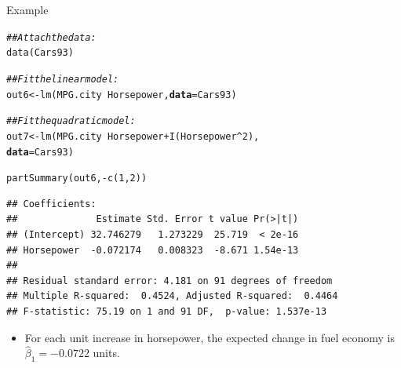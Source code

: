 \documentclass{beamer}\usepackage[]{graphicx}\usepackage[]{color}
\makeatletter
\newcommand{\hlnum}[1]{\textcolor[rgb]{0.69,0.494,0}{#1}}%
\newcommand{\hlcom}[1]{\textcolor[rgb]{0.514,0.506,0.514}{\textit{#1}}}%
\newcommand{\hlopt}[1]{\textcolor[rgb]{0,0,0}{#1}}%
\newcommand{\hlstd}[1]{\textcolor[rgb]{0,0,0}{#1}}%
\newcommand{\hlkwb}[1]{\textcolor[rgb]{0,0.341,0.682}{#1}}%
\newcommand{\hlkwc}[1]{\textcolor[rgb]{0,0,0}{\textbf{#1}}}%
\newcommand{\hlkwd}[1]{\textcolor[rgb]{0.004,0.004,0.506}{#1}}%
\newenvironment{kframe}{%
 \def\at@end@of@kframe{}%
 \ifinner\ifhmode%
  \def\at@end@of@kframe{\end{minipage}}%
  \begin{minipage}{\columnwidth}%
 \fi\fi%
 \def\FrameCommand##1{\hskip\@totalleftmargin \hskip-\fboxsep
 \colorbox{shadecolor}{##1}\hskip-\fboxsep
     \hskip-\linewidth \hskip-\@totalleftmargin \hskip\columnwidth}%
 \MakeFramed {\advance\hsize-\width
   \@totalleftmargin\z@ \linewidth\hsize
   \@setminipage}}%
 {\par\unskip\endMakeFramed%
 \at@end@of@kframe}
\newenvironment{knitrout}{}{} %
\makeatother
\begin{document}

\begin{frame}{Example}

\begin{knitrout}\footnotesize
{}\color{fgcolor}\begin{kframe}
\begin{alltt}
\hlcom{## Attach the data:}
\hlkwd{data}\hlstd{(Cars93)}

\hlcom{## Fit the linear model:}
\hlstd{out6} \hlkwb{<-} \hlkwd{lm}\hlstd{(MPG.city} \hlopt{~} \hlstd{Horsepower,} \hlkwc{data} \hlstd{= Cars93)}

\hlcom{## Fit the quadratic model:}
\hlstd{out7} \hlkwb{<-} \hlkwd{lm}\hlstd{(MPG.city} \hlopt{~} \hlstd{Horsepower} \hlopt{+} \hlkwd{I}\hlstd{(Horsepower}\hlopt{^}\hlnum{2}\hlstd{),}
           \hlkwc{data} \hlstd{= Cars93)}
\end{alltt}
\end{kframe}
\end{knitrout}

\pagebreak

\begin{knitrout}\footnotesize
{}\color{fgcolor}\begin{kframe}
\begin{alltt}
\hlkwd{partSummary}\hlstd{(out6,} \hlopt{-}\hlkwd{c}\hlstd{(}\hlnum{1}\hlstd{,} \hlnum{2}\hlstd{))}
\end{alltt}
\begin{verbatim}
## Coefficients:
##              Estimate Std. Error t value Pr(>|t|)
## (Intercept) 32.746279   1.273229  25.719  < 2e-16
## Horsepower  -0.072174   0.008323  -8.671 1.54e-13
## 
## Residual standard error: 4.181 on 91 degrees of freedom
## Multiple R-squared:  0.4524,	Adjusted R-squared:  0.4464 
## F-statistic: 75.19 on 1 and 91 DF,  p-value: 1.537e-13
\end{verbatim}
\end{kframe}
\end{knitrout}
  
\begin{itemize}
\item For each unit increase in horsepower, the expected change in fuel economy 
  is $\hat{\beta}_1 = -0.0722$ units.
\end{itemize}

\end{frame}
\end{document}
